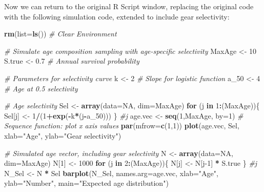 \documentclass[
]{krantz}
\makeatletter
\newenvironment{Shaded}{\begin{snugshade}}{\end{snugshade}}
\newcommand{\AttributeTok}[1]{\textcolor[rgb]{0.27,0.27,0.27}{#1}}
\newcommand{\CommentTok}[1]{\textcolor[rgb]{0.37,0.37,0.37}{\textit{#1}}}
\newcommand{\ConstantTok}[1]{\textcolor[rgb]{0.37,0.37,0.37}{#1}}
\newcommand{\ControlFlowTok}[1]{\textcolor[rgb]{0.27,0.27,0.27}{\textbf{#1}}}
\newcommand{\DecValTok}[1]{\textcolor[rgb]{0.06,0.06,0.06}{#1}}
\newcommand{\FloatTok}[1]{\textcolor[rgb]{0.06,0.06,0.06}{#1}}
\newcommand{\FunctionTok}[1]{\textcolor[rgb]{0.27,0.27,0.27}{\textbf{#1}}}
\newcommand{\NormalTok}[1]{#1}
\newcommand{\OtherTok}[1]{\textcolor[rgb]{0.37,0.37,0.37}{#1}}
\newcommand{\SpecialCharTok}[1]{\textcolor[rgb]{0.43,0.43,0.43}{\textbf{#1}}}
\newcommand{\StringTok}[1]{\textcolor[rgb]{0.5,0.5,0.5}{#1}}
\newenvironment{kframe}{%
\medskip{}
\setlength{\fboxsep}{.8em}
 \def\at@end@of@kframe{}%
 \ifinner\ifhmode%
  \def\at@end@of@kframe{\end{minipage}}%
  \begin{minipage}{\columnwidth}%
 \fi\fi%
 \def\FrameCommand##1{\hskip\@totalleftmargin \hskip-\fboxsep
 \colorbox{shadecolor}{##1}\hskip-\fboxsep
     \hskip-\linewidth \hskip-\@totalleftmargin \hskip\columnwidth}%
 \MakeFramed {\advance\hsize-\width
   \@totalleftmargin\z@ \linewidth\hsize
   \@setminipage}}%
 {\par\unskip\endMakeFramed%
 \at@end@of@kframe}
\renewenvironment{Shaded}{\begin{kframe}}{\end{kframe}}
\makeatother
\begin{document}
Now we can return to the original R Script window, replacing the original code with the following simulation code, extended to include gear selectivity:

\begin{Shaded}
\begin{Highlighting}[]
\FunctionTok{rm}\NormalTok{(}\AttributeTok{list=}\FunctionTok{ls}\NormalTok{()) }\CommentTok{\# Clear Environment}

\CommentTok{\# Simulate age composition sampling with age{-}specific selectivity}
\NormalTok{MaxAge }\OtherTok{\textless{}{-}} \DecValTok{10}
\NormalTok{S.true }\OtherTok{\textless{}{-}} \FloatTok{0.7} \CommentTok{\# Annual survival probability}

\CommentTok{\# Parameters for selectivity curve}
\NormalTok{k }\OtherTok{\textless{}{-}} \DecValTok{2} \CommentTok{\# Slope for logistic function}
\NormalTok{a\_50 }\OtherTok{\textless{}{-}} \DecValTok{4} \CommentTok{\# Age at 0.5 selectivity}

\CommentTok{\# Age selectivity}
\NormalTok{Sel }\OtherTok{\textless{}{-}} \FunctionTok{array}\NormalTok{(}\AttributeTok{data=}\ConstantTok{NA}\NormalTok{, }\AttributeTok{dim=}\NormalTok{MaxAge)}
\ControlFlowTok{for}\NormalTok{ (j }\ControlFlowTok{in} \DecValTok{1}\SpecialCharTok{:}\NormalTok{(MaxAge))\{}
\NormalTok{  Sel[j] }\OtherTok{\textless{}{-}} \DecValTok{1}\SpecialCharTok{/}\NormalTok{(}\DecValTok{1}\SpecialCharTok{+}\FunctionTok{exp}\NormalTok{(}\SpecialCharTok{{-}}\NormalTok{k}\SpecialCharTok{*}\NormalTok{(j}\SpecialCharTok{{-}}\NormalTok{a\_50)))}
\NormalTok{\} }\CommentTok{\#j}
\NormalTok{age.vec }\OtherTok{\textless{}{-}} \FunctionTok{seq}\NormalTok{(}\DecValTok{1}\NormalTok{,MaxAge, }\AttributeTok{by=}\DecValTok{1}\NormalTok{)  }\CommentTok{\# Sequence function: plot x axis values}
\FunctionTok{par}\NormalTok{(}\AttributeTok{mfrow=}\FunctionTok{c}\NormalTok{(}\DecValTok{1}\NormalTok{,}\DecValTok{1}\NormalTok{))}
\FunctionTok{plot}\NormalTok{(age.vec, Sel, }\AttributeTok{xlab=}\StringTok{"Age"}\NormalTok{, }\AttributeTok{ylab=}\StringTok{"Gear selectivity"}\NormalTok{)}

\CommentTok{\# Simulated age vector, including gear selectivity}
\NormalTok{N }\OtherTok{\textless{}{-}} \FunctionTok{array}\NormalTok{(}\AttributeTok{data=}\ConstantTok{NA}\NormalTok{, }\AttributeTok{dim=}\NormalTok{MaxAge)}
\NormalTok{N[}\DecValTok{1}\NormalTok{] }\OtherTok{\textless{}{-}} \DecValTok{1000}
\ControlFlowTok{for}\NormalTok{ (j }\ControlFlowTok{in} \DecValTok{2}\SpecialCharTok{:}\NormalTok{(MaxAge))\{}
\NormalTok{  N[j] }\OtherTok{\textless{}{-}}\NormalTok{ N[j}\DecValTok{{-}1}\NormalTok{] }\SpecialCharTok{*}\NormalTok{ S.true}
\NormalTok{\} }\CommentTok{\#j}
\NormalTok{N\_Sel }\OtherTok{\textless{}{-}}\NormalTok{ N }\SpecialCharTok{*}\NormalTok{ Sel}
\FunctionTok{barplot}\NormalTok{(N\_Sel, }\AttributeTok{names.arg=}\NormalTok{age.vec, }\AttributeTok{xlab=}\StringTok{"Age"}\NormalTok{, }\AttributeTok{ylab=}\StringTok{"Number"}\NormalTok{, }
        \AttributeTok{main=}\StringTok{"Expected age distribution"}\NormalTok{)}


\end{Highlighting}
\end{Shaded}
\end{document}

